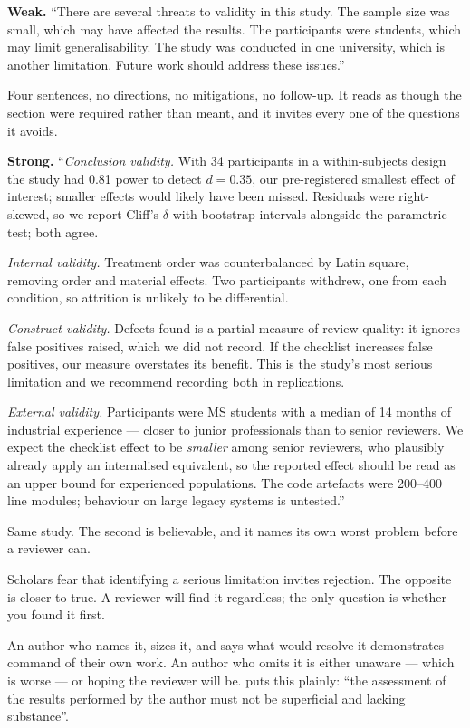 \begin{worked}
\textbf{Weak.} ``There are several threats to validity in this study. The
sample size was small, which may have affected the results. The participants
were students, which may limit generalisability. The study was conducted in one
university, which is another limitation. Future work should address these
issues.''

\medskip
Four sentences, no directions, no mitigations, no follow-up. It reads as though
the section were required rather than meant, and it invites every one of the
questions it avoids.

\medskip
\textbf{Strong.} ``\emph{Conclusion validity.} With 34 participants in a
within-subjects design the study had 0.81 power to detect $d = 0.35$, our
pre-registered smallest effect of interest; smaller effects would likely have
been missed. Residuals were right-skewed, so we report Cliff's $\delta$ with
bootstrap intervals alongside the parametric test; both agree.

\medskip
\emph{Internal validity.} Treatment order was counterbalanced by Latin square,
removing order and material effects. Two participants withdrew, one from each
condition, so attrition is unlikely to be differential.

\medskip
\emph{Construct validity.} Defects found is a partial measure of review
quality: it ignores false positives raised, which we did not record. If the
checklist increases false positives, our measure overstates its benefit. This
is the study's most serious limitation and we recommend recording both in
replications.

\medskip
\emph{External validity.} Participants were MS students with a median of 14
months of industrial experience --- closer to junior professionals than to
senior reviewers. We expect the checklist effect to be \emph{smaller} among
senior reviewers, who plausibly already apply an internalised equivalent, so
the reported effect should be read as an upper bound for experienced
populations. The code artefacts were 200--400 line modules; behaviour on large
legacy systems is untested.''

\medskip
Same study. The second is believable, and it names its own worst problem before
a reviewer can.
\end{worked}

\begin{conceptbox}
Scholars fear that identifying a serious limitation invites rejection. The
opposite is closer to true. A reviewer will find it regardless; the only
question is whether you found it first.

\medskip
An author who names it, sizes it, and says what would resolve it demonstrates
command of their own work. An author who omits it is either unaware --- which
is worse --- or hoping the reviewer will be. 
puts this plainly: ``the assessment of the results performed by the author must
not be superficial and lacking substance''.
\end{conceptbox}

